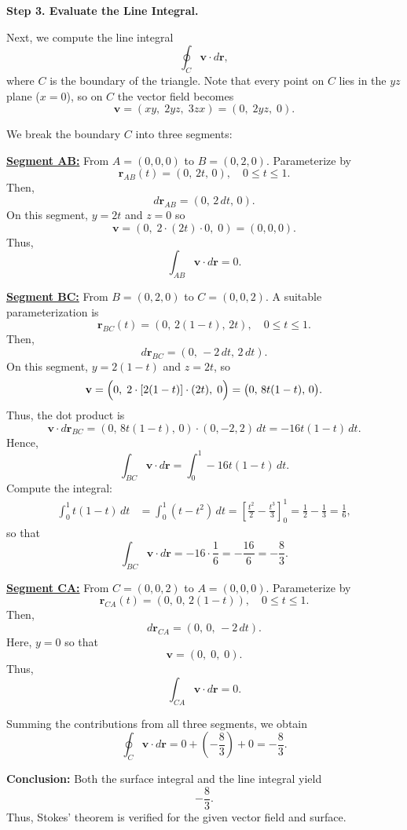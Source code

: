 \begin{hwkProblem}{1.34}{}
	\medskip
	\textbf{Step 3. Evaluate the Line Integral.}

	Next, we compute the line integral
	\[
		\oint_C \mathbf{v}\cdot d\mathbf{r},
	\]
	where \(C\) is the boundary of the triangle. Note that every point on \(C\) lies in the \(yz\) plane (\(x=0\)), so on \(C\) the vector field becomes
	\[
		\mathbf{v} = (xy,\; 2yz,\; 3zx) = (0,\; 2yz,\; 0).
	\]

	We break the boundary \(C\) into three segments:

	\medskip
	\underline{\textbf{Segment AB:}} From \(A=(0,0,0)\) to \(B=(0,2,0)\).  
	Parameterize by
	\[
		\mathbf{r}_{AB}(t)=(0,\,2t,\,0),\quad 0\le t\le 1.
	\]
	Then,
	\[
		d\mathbf{r}_{AB} = (0,\,2\,dt,\,0).
	\]
	On this segment, \(y=2t\) and \(z=0\) so
	\[
		\mathbf{v} = (0,\; 2\cdot (2t)\cdot 0,\; 0) = (0,0,0).
	\]
	Thus,
	\[
		\int_{AB} \mathbf{v}\cdot d\mathbf{r} = 0.
	\]

	\medskip
	\underline{\textbf{Segment BC:}} From \(B=(0,2,0)\) to \(C=(0,0,2)\).  
	A suitable parameterization is
	\[
		\mathbf{r}_{BC}(t)=(0,\,2(1-t),\,2t),\quad 0\le t\le 1.
	\]
	Then,
	\[
		d\mathbf{r}_{BC} = \left(0,\,-2\,dt,\,2\,dt\right).
	\]
	On this segment, \(y=2(1-t)\) and \(z=2t\), so
	\[
		\mathbf{v} = \Bigl(0,\;2\cdot[2(1-t)]\cdot(2t),\;0\Bigr) = \bigl(0,\,8t(1-t),\,0\bigr).
	\]
	Thus, the dot product is
	\[
		\mathbf{v}\cdot d\mathbf{r}_{BC} = (0,\,8t(1-t),\,0)\cdot (0,-2,2)\,dt = -16t(1-t)\,dt.
	\]
	Hence,
	\[
		\int_{BC} \mathbf{v}\cdot d\mathbf{r} = \int_{0}^{1} -16t(1-t)\,dt.
	\]
	Compute the integral:
	\[
		\begin{aligned}
			\int_{0}^{1} t(1-t)\,dt &= \int_{0}^{1} (t-t^2)\,dt 
			= \left[\frac{t^2}{2} - \frac{t^3}{3}\right]_0^1 
			= \frac{1}{2} - \frac{1}{3} 
			= \frac{1}{6},
		\end{aligned}
	\]
	so that
	\[
		\int_{BC} \mathbf{v}\cdot d\mathbf{r} = -16\cdot\frac{1}{6} = -\frac{16}{6} = -\frac{8}{3}.
	\]

	\medskip
	\underline{\textbf{Segment CA:}} From \(C=(0,0,2)\) to \(A=(0,0,0)\).  
	Parameterize by
	\[
		\mathbf{r}_{CA}(t)=(0,\,0,\,2(1-t)),\quad 0\le t\le 1.
	\]
	Then,
	\[
		d\mathbf{r}_{CA} = (0,\,0,\,-2\,dt).
	\]
	Here, \(y=0\) so that
	\[
		\mathbf{v} = (0,\;0,\;0).
	\]
	Thus,
	\[
		\int_{CA} \mathbf{v}\cdot d\mathbf{r} = 0.
	\]

	\medskip
	Summing the contributions from all three segments, we obtain
	\[
		\oint_C \mathbf{v}\cdot d\mathbf{r} = 0 + \left(-\frac{8}{3}\right) + 0 = -\frac{8}{3}.
	\]

	\medskip
	\textbf{Conclusion:}  
	Both the surface integral and the line integral yield
	\[
		-\frac{8}{3}.
	\]
	Thus, Stokes' theorem is verified for the given vector field and surface.

\end{hwkProblem}



